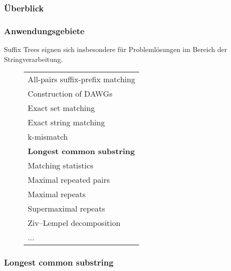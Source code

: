 \documentclass{beamer}
\begin{document}
\subsubsection{Überblick}

\begin{frame}
\frametitle{Anwendungsgebiete}
Suffix Trees eignen sich insbesondere für Problemlösungen im Bereich der Stringverarbeitung.
\begin{figure}
\begin{tabular}{l}
    \toprule
    All-pairs suffix-prefix matching      \\
    Construction of DAWGs                 \\
    Exact set matching                    \\
    Exact string matching                 \\
    k-mismatch                            \\
    \textbf{Longest common substring}     \\
    Matching statistics                   \\
    Maximal repeated pairs                \\
    Maximal repeats                       \\
    Supermaximal repeats                  \\
    Ziv–Lempel decomposition              \\
    ...                                   \\
    \bottomrule
\end{tabular}
\end{figure}
\end{frame}

\subsubsection{Longest common substring}
\end{document}
